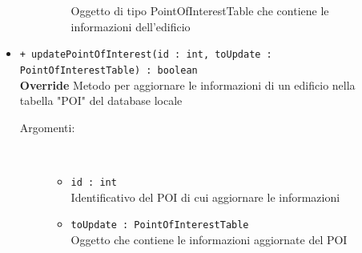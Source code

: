 \documentclass[../DefinizioneDiProdotto.tex]{subfiles}
\begin{document}
\begin{description}
\begin{itemize}
\begin{description}
\begin{itemize}
				Oggetto di tipo PointOfInterestTable che contiene le informazioni dell'edificio\end{itemize}
		\end{description}
		\item \texttt{+ updatePointOfInterest(id : int, toUpdate : PointOfInterestTable) : boolean}\\
		\textbf{Override} Metodo per aggiornare le informazioni di un edificio nella tabella "POI" del database locale
		\begin{description}
			\item[Argomenti:] \
			\begin{itemize}
				\item \texttt{id : int}\\
				Identificativo del POI di cui aggiornare le informazioni\item \texttt{toUpdate : PointOfInterestTable}\\
				Oggetto che contiene le informazioni aggiornate del POI\end{itemize}
		\end{description}
	\end{itemize}
\end{description}
\end{document}
